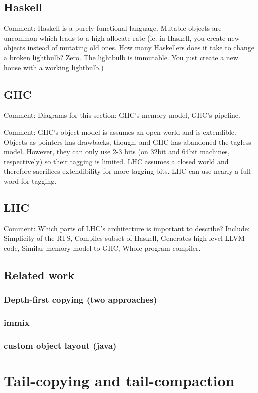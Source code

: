 \documentclass[a4paper,oneside]{memoir}
\newcommand{\makecomment}[1]{{\color{red} Comment: #1}}
\begin{document}
\section{Haskell}
\makecomment{Haskell is a purely functional language.\cite{HaskellReport} Mutable objects are
uncommon which leads to a high allocate rate (ie. in Haskell, you create new
objects instead of mutating old ones. How many Haskellers does it take to
change a broken lightbulb? Zero. The lightbulb is immutable. You just create
a new house with a working lightbulb.)}

\section{GHC}
\makecomment{Diagrams for this section: GHC's memory model, GHC's pipeline.}

\makecomment{GHC's object model is assumes an open-world and is extendible.
Objects as pointers has drawbacks, though, and GHC has abandoned the tagless
model. However, they can only use 2-3 bits (on 32bit and 64bit machines,
respectively) so their tagging is limited. LHC assumes a closed world and therefore
sacrifices extendibility for more tagging bits. LHC can use nearly a full word
for tagging.}

\section{LHC}
\makecomment{Which parts of LHC's architecture is important to describe? \cite{LHC}
Include: Simplicity of the RTS, Compiles subset of Haskell, Generates high-level
LLVM code, Similar memory model to GHC, Whole-program compiler.}

\section{Related work}
\subsection{Depth-first copying (two approaches)}
\subsection{immix}
\subsection{custom object layout (java)}

\chapter{Tail-copying and tail-compaction}
\end{document}
